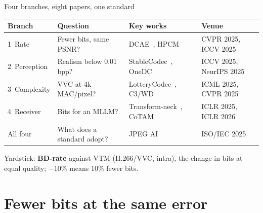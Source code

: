 \documentclass[aspectratio=169]{beamer}
\begin{document}
\begin{frame}{Four branches, eight papers, one standard}
  \begin{center}
  \footnotesize
  \begin{tabular}{llll}
    \toprule
    Branch & Question & Key works & Venue \\
    \midrule
    \textcolor{sig}{1~Rate} & Fewer bits, same PSNR? & DCAE~\cite{lu2025dcae}, HPCM~\cite{li2025hpcm} & CVPR 2025, ICCV 2025 \\
    \textcolor{accent}{2~Perception} & Realism below 0.01 bpp? & StableCodec~\cite{zhang2025stablecodec}, OneDC~\cite{xue2025onedc} & ICCV 2025, NeurIPS 2025 \\
    \textcolor{video}{3~Complexity} & VVC at 4k MAC/pixel? & LotteryCodec~\cite{wu2025lottery}, C3/WD~\cite{balle2025gcf} & ICML 2025, CVPR 2025 \\
    \textcolor{hot}{4~Receiver} & Bits for an MLLM? & Transform-neck~\cite{kao2025neck}, CoTAM~\cite{liu2026cotam} & ICLR 2025, ICLR 2026 \\
    \midrule
    All four & What does a standard adopt? & JPEG AI~\cite{jpegai2025,esenlik2025} & ISO/IEC 2025 \\
    \bottomrule
  \end{tabular}
  \end{center}
  \medskip
  Yardstick: \textbf{BD-rate} against VTM (H.266/VVC, intra), the change in bits at equal quality; $-10\%$ means $10\%$ fewer bits.
\end{frame}

\section{Fewer bits at the same error}
\end{document}
